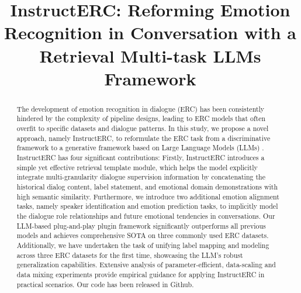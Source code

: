 \documentclass[conference]{IEEEtran}
\begin{document}
\title{InstructERC: Reforming Emotion Recognition in Conversation with a Retrieval Multi-task LLMs Framework\\
}
\author{


}



\maketitle

\begin{abstract}
The development of emotion recognition in dialogue (ERC) has been consistently hindered by the complexity of pipeline designs, leading to ERC models that often overfit to specific datasets and dialogue patterns.
In this study, we propose a novel approach, namely InstructERC, to reformulate the ERC task from a discriminative framework to a generative framework based on Large Language Models (LLMs) . InstructERC has four significant contributions: Firstly, InstructERC introduces a simple yet effective retrieval template module, which helps the model explicitly integrate multi-granularity dialogue supervision information by concatenating the historical dialog content, label statement, and emotional domain demonstrations with high semantic similarity. Furthermore, we introduce two additional emotion alignment tasks, namely speaker identification and emotion prediction tasks, to implicitly model the dialogue role relationships and future emotional tendencies in conversations. Our LLM-based plug-and-play plugin framework significantly outperforms all previous models and achieves comprehensive SOTA on three commonly used ERC datasets. Additionally, we have undertaken the task of unifying label mapping and modeling across three ERC datasets for the first time, showcasing the LLM's robust generalization capabilities. Extensive analysis of parameter-efficient, data-scaling and data mixing experiments provide empirical guidance for applying InstructERC in practical scenarios. Our code has been released in Github.
\end{abstract}
\end{document}
